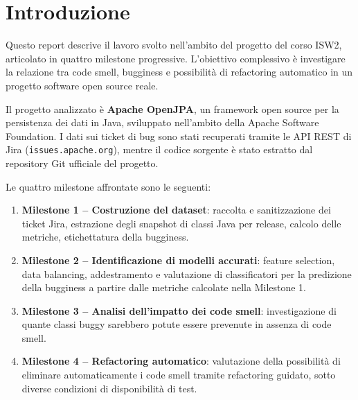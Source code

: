 \section{Introduzione}

Questo report descrive il lavoro svolto nell'ambito del progetto del corso ISW2,
articolato in quattro milestone progressive. L'obiettivo complessivo è investigare la
relazione tra code smell, bugginess e possibilità di refactoring automatico in un progetto
software open source reale.

Il progetto analizzato è \textbf{Apache OpenJPA}, un framework open source per la
persistenza dei dati in Java, sviluppato nell'ambito della Apache Software Foundation.
I dati sui ticket di bug sono stati recuperati tramite le API REST di Jira
(\texttt{issues.apache.org}), mentre il codice sorgente è stato estratto dal repository
Git ufficiale del progetto.

Le quattro milestone affrontate sono le seguenti:

\begin{enumerate}
    \item \textbf{Milestone 1 -- Costruzione del dataset}: raccolta e sanitizzazione dei
    ticket Jira, estrazione degli snapshot di classi Java per release, calcolo delle
    metriche, etichettatura della bugginess.

    \item \textbf{Milestone 2 -- Identificazione di modelli accurati}: feature selection, data balancing, addestramento e
    valutazione di classificatori per la predizione della bugginess a partire dalle
    metriche calcolate nella Milestone 1.

    \item \textbf{Milestone 3 -- Analisi dell'impatto dei code smell}: investigazione di
    quante classi buggy sarebbero potute essere prevenute in assenza di code smell.

    \item \textbf{Milestone 4 -- Refactoring automatico}: valutazione della possibilità
    di eliminare automaticamente i code smell tramite refactoring guidato, sotto diverse
    condizioni di disponibilità di test.
\end{enumerate}
